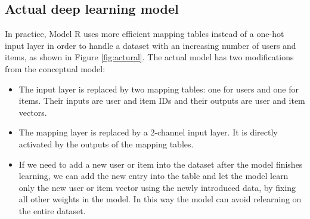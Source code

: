 \documentclass[conference]{IEEEtran}
\begin{document}
\subsection{Actual deep learning model}
In practice, Model R uses more efficient mapping tables instead of a 
one-hot input layer in order to handle a dataset with an increasing number of 
users and items, as shown in Figure \ref{fig:actural}.
The actual model has two modifications from the conceptual model:
\begin{itemize}
	\item The input layer is replaced by two mapping tables: one for users and 
	one for items.
	Their inputs are user and item IDs and their outputs are user and item 
	vectors.
	\item The mapping layer is replaced by a 2-channel input layer. It is 
	directly activated by the outputs of the mapping tables.
	\item If we need to add a new user or item into the dataset
	after the model finishes learning,
	we can add the new entry into the table and let the model learn
	only the new user or item vector using the newly introduced data,
	by fixing all other weights in the model.
	In this way the model can avoid relearning on the entire dataset.
\end{itemize}
\end{document}
